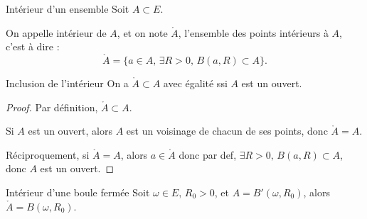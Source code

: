 \begin{definition}{Intérieur d'un ensemble}{}
    Soit $A \subset E$. 

    On appelle intérieur de $A$, et on note $\mathring{A}$, l'ensemble des points intérieurs à $A$, 
    c'est à dire : 
    \[\mathring A = \{a \in A, \, \exists R > 0, \, B(a, R) \subset A\}.\]
\end{definition}

\begin{proposition}{Inclusion de l'intérieur}{}
    On a $\mathring A \subset A$ avec égalité ssi $A$ est un ouvert.
\end{proposition}

\begin{proof}
    Par définition, $\mathring A \subset A$.

    Si $A$ est un ouvert, alors $A$ est un voisinage de chacun de ses points, donc $\mathring{A} = A$.

    Réciproquement, si $\mathring{A} = A$, 
    alors $a \in \mathring A$ donc par def, $\exists R > 0, \, B(a, R) \subset A$, donc $A$ est un ouvert.
\end{proof}

\begin{corollaire}{Intérieur d'une boule fermée}{}
    Soit $\omega \in E, \, R_0 > 0$, et $A = B'(\omega, R_0)$, alors $\mathring A = B(\omega, R_0)$.
\end{corollaire}


